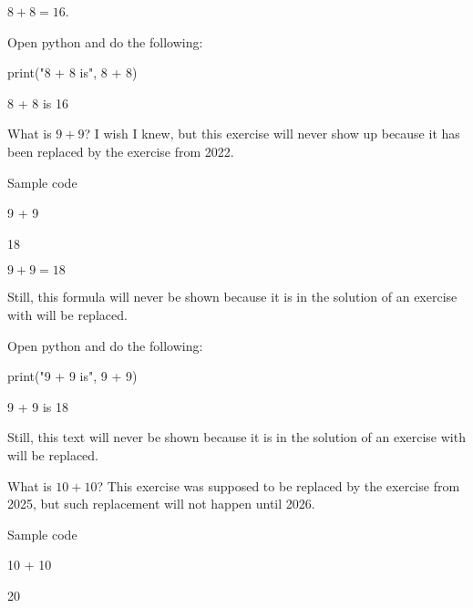 \documentclass{book}
\begin{document}
\begin{solution}
  \(8 + 8 = 16\).
\end{solution}

\begin{additionalinformation}
Open python and do the following:

\begin{pycell}
print("8 + 8 is", 8 + 8)
\end{pycell}
\begin{pyexpectedoutput}
8 + 8 is 16
\end{pyexpectedoutput}
\end{additionalinformation}

\begin{exercise}[examdate={January 16, 2023}, examproblemnumber={1}, examproblemid={2023-01-16-01}, replacedbyexamproblemid={2022-01-16-01}, replacementsinceacademicyear={2025/2026}]
  What is \(9 + 9\)? I wish I knew, but this exercise will never show up because it has been replaced by the exercise from 2022.

Sample code
\begin{pycell}
9 + 9
\end{pycell}
\begin{pyexpectedoutput}
18
\end{pyexpectedoutput}
\end{exercise}

\begin{solution}
  \(9 + 9 = 18\)

Still, this formula will never be shown because it is in the solution of an exercise with will be replaced.
\end{solution}

\begin{additionalinformation}
Open python and do the following:

\begin{pycell}
print("9 + 9 is", 9 + 9)
\end{pycell}
\begin{pyexpectedoutput}
9 + 9 is 18
\end{pyexpectedoutput}

Still, this text will never be shown because it is in the solution of an exercise with will be replaced.
\end{additionalinformation}

\begin{exercise}[examdate={January 16, 2024}, examproblemnumber={1}, examproblemid={2024-01-16-01}, replacedbyexamproblemid={2023-01-16-01}, replacementsinceacademicyear={2026/2027}]
  What is \(10 + 10\)? This exercise was supposed to be replaced by the exercise from 2025, but such replacement will not happen until 2026.

Sample code
\begin{pycell}
10 + 10
\end{pycell}
\begin{pyexpectedoutput}
20
\end{pyexpectedoutput}
\end{exercise}
\end{document}

